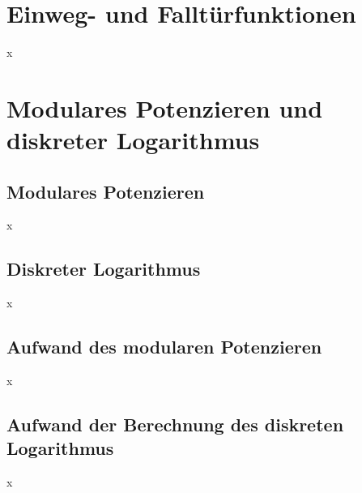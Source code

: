 \section{Einweg- und Falltürfunktionen}
x

\section{Modulares Potenzieren und diskreter Logarithmus}
\subsection{Modulares Potenzieren}
x

\subsection{Diskreter Logarithmus}
x

\subsection{Aufwand des modularen Potenzieren}
x

\subsection{Aufwand der Berechnung des diskreten Logarithmus}
x

